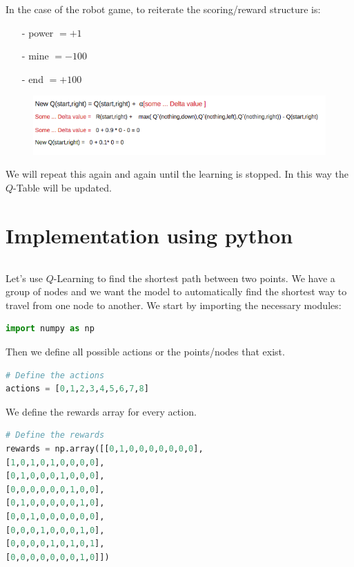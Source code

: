 In the case of the robot game, to reiterate the scoring/reward structure is:

\begin{itemize}
\setlength{\parskip}{0pt}
\item[-]
power $= +1$
\item[-]
mine $= -100$
\item[-]
end $= +100$
\end{itemize}

\begin{figure}[!htb]
\centering
\includegraphics[scale=0.7]{pix/q_learning/q_robot_maze_iteration.png}
\end{figure}
We will repeat this again and again until the learning is stopped. In this way 
the $Q$-Table will be updated.


\section{Implementation using python}
\begin{lstlisting}[language=Python]
\end{lstlisting}

Let's use $Q$-Learning to find the shortest path between two points. We have a group 
of nodes and we want the model to automatically find the shortest way to travel from 
one node to another. We start by importing the necessary modules:

\begin{lstlisting}[language=Python]
import numpy as np
\end{lstlisting}

Then we define all possible actions or the points/nodes that exist.
\begin{lstlisting}[language=Python]
# Define the actions
actions = [0,1,2,3,4,5,6,7,8]
\end{lstlisting}

We define the rewards array for every action.
\begin{lstlisting}[language=Python]
# Define the rewards
rewards = np.array([[0,1,0,0,0,0,0,0,0],
[1,0,1,0,1,0,0,0,0],
[0,1,0,0,0,1,0,0,0],
[0,0,0,0,0,0,1,0,0],
[0,1,0,0,0,0,0,1,0],
[0,0,1,0,0,0,0,0,0],
[0,0,0,1,0,0,0,1,0],
[0,0,0,0,1,0,1,0,1],
[0,0,0,0,0,0,0,1,0]])
\end{lstlisting}

